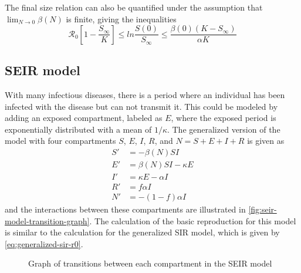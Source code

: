 The final size relation can also be quantified under the assumption that $\lim_{N \to 0} \beta(N)$ is finite, giving the inequalities \cite{brauerCompartmentalModelsEpidemiology2008}
\begin{equation*}
    \mathcal{R}_0 \left[ 1 - \frac{S_\infty}{K} \right] \leq ln \frac{S(0)}{S_\infty} \leq \frac{\beta(0)(K - S_\infty)}{\alpha K}
\end{equation*}

\subsection{SEIR model}

With many infectious diseases, there is a period where an individual has been infected with the disease but can not transmit it.
This could be modeled by adding an exposed compartment, labeled as $E$, where the exposed period is exponentially distributed with a mean of $1 / \kappa$.
The generalized version of the model with four compartments $S$, $E$, $I$, $R$, and $N = S + E + I + R$ is given as \cite{brauerCompartmentalModelsEpidemiology2008}
\begin{align*}
    S' &= - \beta(N)SI \\
    E' &= \beta(N)SI - \kappa E \\
    I' &= \kappa E - \alpha I \\
    R' &= f \alpha I \\
    N' &= - (1 - f) \alpha I
\end{align*}
and the interactions between these compartments are illustrated in \autoref{fig:seir-model-transition-graph}.
The calculation of the basic reproduction for this model is similar to the calculation for the generalized SIR model, which is given by \autoref{eq:generalized-sir-r0}.

\begin{figure}
    \centering
    \caption{Graph of transitions between each compartment in the SEIR model}
    \label{fig:seir-model-transition-graph}
\end{figure}

